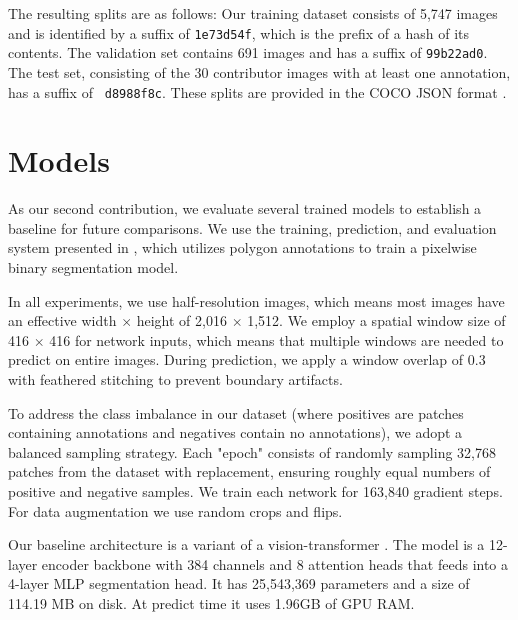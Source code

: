 \documentclass[10pt,twocolumn,letterpaper]{article}
\begin{document}
The resulting splits are as follows:
Our training dataset consists of 5,747 images and is identified by a suffix of {\tt 1e73d54f}, which is the
  prefix of a hash of its contents.
The validation set contains 691 images and has a suffix of {\tt 99b22ad0}.
The test set, consisting of the 30 contributor images with at least one annotation, has a suffix of {\tt
  d8988f8c}.
These splits are provided in the COCO JSON format \cite{lin_microsoft_2014}.


\section{Models}
\label{sec:models}

As our second contribution, we evaluate several trained models to establish a baseline for future
  comparisons.
We use the training, prediction, and evaluation system presented in \cite{Greenwell_2024_WACV,
  crall_geowatch_2024}, which utilizes polygon annotations to train a pixelwise binary segmentation model.


In all experiments, we use half-resolution images, which means most images have an effective width $\times$
  height of 2,016 $\times$ 1,512.
We employ a spatial window size of 416 $\times$ 416 for network inputs, which means that multiple windows
  are needed to predict on entire images.
During prediction, we apply a window overlap of 0.3 with feathered stitching to prevent boundary artifacts.

To address the class imbalance in our dataset (where positives are patches containing annotations and
  negatives contain no annotations), we adopt a balanced sampling strategy.
Each "epoch" consists of randomly sampling 32,768 patches from the dataset with replacement, ensuring
  roughly equal numbers of positive and negative samples.
We train each network for 163,840 gradient steps.
For data augmentation we use random crops and flips.

Our baseline architecture is a variant \cite{bertasius2021space,Greenwell_2024_WACV} of a vision-transformer
  \cite{dosovitskiy_image_2021}.
The model is a 12-layer encoder backbone with 384 channels and 8 attention heads that feeds into a 4-layer
  MLP segmentation head.
It has 25,543,369 parameters and a size of 114.19 MB on disk.
At predict time it uses 1.96GB of GPU RAM.
\end{document}
